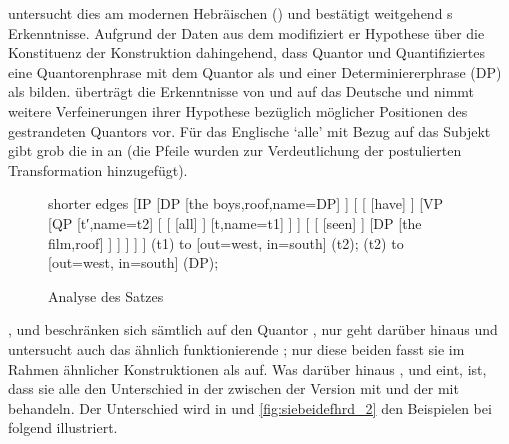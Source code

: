 \citet{shlonsky1991} untersucht dies am modernen Hebräischen () und
bestätigt weitgehend \citeauthor{sportiche1988}s Erkenntnisse. Aufgrund der
Daten aus dem  modifiziert er  Hypothese
über die Konstituenz der Konstruktion dahingehend, dass Quantor und
Quantifiziertes eine Quantorenphrase mit dem Quantor als  und einer
Determiniererphrase (DP) als  bilden.
\citet{merchant1996} überträgt die Erkenntnisse von \citet{sportiche1988} und
\citet{shlonsky1991} auf das Deutsche und nimmt weitere
Verfeinerungen ihrer Hypothese bezüglich möglicher Positionen des gestrandeten
Quantors vor. Für das Englische  `alle' mit Bezug auf das
Subjekt gibt \citet{merchant1996} grob die  in
 an (die Pfeile wurden zur Verdeutlichung der postulierten
Transformation hinzugefügt).

\begin{figure}
	\begin{forest} shorter edges
	[IP
		[DP
			[{the boys},roof,name=DP]
		]
		[
			[
				[have]
			]
			[VP
				[QP
					[t′,name=t2]
					[
						[
							[all]
						]
						[t,name=t1]
					]
				]
				[
					[
						[seen]
					]
					[DP
						[{the film},roof]
					]
				]
			]
		]
	]
	 (t1) to [out=west, in=south] (t2);
	 (t2) to [out=west, in=south] (DP);
	\end{forest}
	\caption{Analyse des Satzes 
	\autocite[nach][180]{merchant1996}}
	\label{fig:qfgg}
\end{figure}

\citet{sportiche1988}, \citet{shlonsky1991} und \citet{merchant1996}
beschränken sich sämtlich auf den Quantor , nur \citet{pittner1995}
geht darüber hinaus und untersucht auch das ähnlich funktionierende ;
nur diese beiden fasst sie im Rahmen ähnlicher Konstruktionen als  auf. Was darüber hinaus \citeauthor{shlonsky1991},
\citeauthor{pittner1995} und \citeauthor{merchant1996} eint, ist, dass sie alle
den Unterschied in der  zwischen der Version mit
 und der mit  behandeln. Der
Unterschied wird in  und \ref{fig:siebeidefhrd_2}
den Beispielen bei \citet[30--31]{pittner1995} folgend illustriert.

